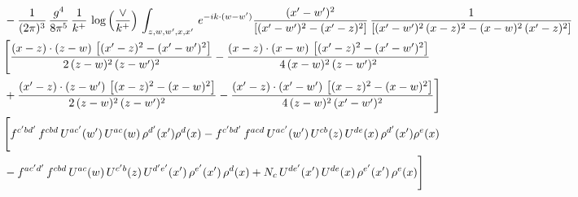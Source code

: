 \documentclass[9pt]{article}
\numberwithin{equation}{section}
\begin{document}
\begin{align}
& -\frac{1}{(2\pi)^{3}}\, \frac{g^{4}}{8\pi^{5}}\,\frac{1}{k^{+}}\,\log{\left(\frac{\vee}{k^{+}}\right)}\,\int_{z,w,w^{\prime},x,x'}\, e^{-ik\cdot (w-w')} \frac{(x'-w')^{2}}{\left[(x'-w')^{2}-(x'-z)^{2}\right]}\, \frac{1}{\left[(x'-w')^{2}\, (x-z)^{2} - (x-w)^{2}\, (x'-z)^{2}\right]}  \notag \\ & \Bigg[\frac{(x-z)\cdot (z-w)\, \left[(x'-z)^{2}-(x'-w')^{2}\right]}{2\, (z-w)^{2}\, (z-w')^{2}}  - \frac{(x-z)\cdot (x-w)\,\left[(x'-z)^{2}-(x'-w')^{2}\right] }{4\,(x-w)^{2}\,(z-w')^{2}}\notag \\ & +\frac{(x'-z)\cdot (z-w')\, \left[(x-z)^{2}-(x-w)^{2}\right]}{2\, (z-w)^{2}\, (z-w')^{2}}-\frac{(x'-z)\cdot (x'-w')\, \left[(x-z)^{2}-(x-w)^{2}\right]}{4\, (z-w)^{2}\,(x'-w')^{2}}\Bigg]\notag \\ & \Bigg[f^{c'bd'}\,f^{cbd}\, U^{ac'}(w')\,U^{ac}(w)\,\rho^{d'}(x')\rho^{d}(x)- f^{c'bd'}\,f^{acd}\,U^{ac'}(w')\,U^{cb}(z)\,U^{de}(x)\,\rho^{d'}(x')\rho^{e}(x) \notag \\ & -f^{ac'd'}\,f^{cbd}\,U^{ac}(w)\,U^{c'b}(z)\,U^{d'e'}(x')\,\rho^{e'}(x')\,\rho^{d}(x) +N_{c}\,U^{de'}(x')\,U^{de}(x)\,\rho^{e'}(x')\,\rho^{e}(x)\Bigg]
\end{align}
\end{document}
